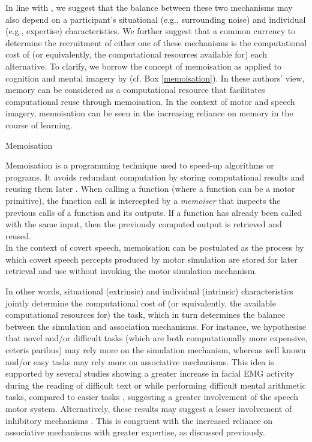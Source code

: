 \documentclass[utf8]{template/frontiersSCNS} %
\begin{document}
In line with \cite{tian_mental_2012}, we suggest that the balance between these two mechanisms may also depend on a participant's situational (e.g., surrounding noise) and individual (e.g., expertise) characteristics. We further suggest that a common currency to determine the recruitment of either one of these mechanisms is the computational cost of (or equivalently, the computational resources available for) each alternative. To clarify, we borrow the concept of memoisation as applied to cognition and mental imagery by \cite{dasgupta_memory_2021} (cf. Box \ref{memoisation}). In these authors' view, memory can be considered as a computational resource that facilitates computational reuse through memoisation. In the context of motor and speech imagery, memoisation can be seen in the increasing reliance on memory in the course of learning.

\begin{mybox}[label=memoisation,float,floatplacement=!htb]{Memoisation}

Memoisation is a programming technique used to speed-up algorithms or programs. It avoids redundant computation by storing computational results and reusing them later \citep{dasgupta_memory_2021}. When calling a function (where a function can be a motor primitive), the function call is intercepted by a \textit{memoiser} that inspects the previous calls of a function and its outputs. If a function has already been called with the same input, then the previously computed output is retrieved and reused.\\

In the context of covert speech, memoisation can be postulated as the process by which covert speech percepts produced by motor simulation are stored for later retrieval and use without invoking the motor simulation mechanism. 

\end{mybox}

In other words, situational (extrinsic) and individual (intrinsic) characteristics jointly determine the computational cost of (or equivalently, the available computational resources for) the task, which in turn determines the balance between the simulation and association mechanisms. For instance, we hypothesise that novel and/or difficult tasks (which are both computationally more expensive, ceteris paribus) may rely more on the simulation mechanism, whereas well known and/or easy tasks may rely more on associative mechanisms. This idea is supported by several studies showing a greater increase in facial EMG activity during the reading of difficult text or while performing difficult mental arithmetic tasks, compared to easier tasks \citep[e.g.,][]{faaborg-andersen_electromyography_1958, sokolov_inner_1972}, suggesting a greater involvement of the speech motor system. Alternatively, these results may suggest a lesser involvement of inhibitory mechanisms \citep[see also the discussion in][]{nalborczyk_understanding_2019-1, nalborczyk_re-analysing_2020}. This is congruent with the increased reliance on associative mechanisms with greater expertise, as discussed previously.
\end{document}
